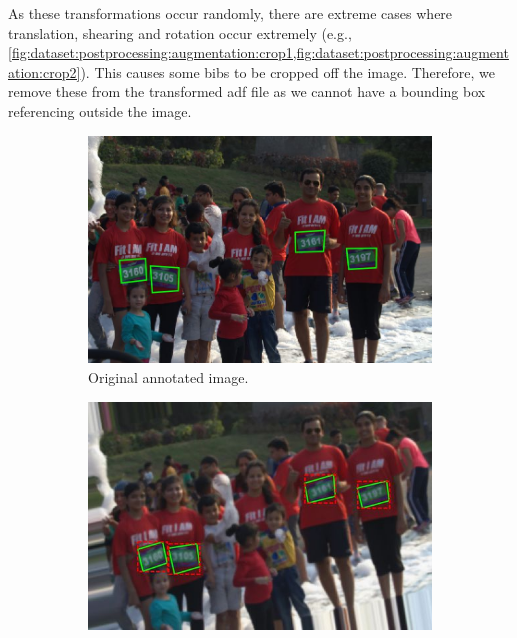 As these transformations occur randomly, there are extreme cases where translation, shearing and rotation occur extremely (e.g., \cref{fig:dataset:postprocessing:augmentation:crop1,fig:dataset:postprocessing:augmentation:crop2}). This causes some bibs to be cropped off the image. Therefore, we remove these from the transformed \gls{adf} file as we cannot have a bounding box referencing outside the image.

\begin{figure}[h!]
  \centering
  \hspace{\fill}
  \begin{subfigure}[b]{0.475\textwidth}
    \includegraphics[width=\textwidth]{images/dataset/augmentation/original}
    \caption{Original annotated image.}
  \end{subfigure}
  \hspace{\fill}
  \begin{subfigure}[b]{0.475\textwidth}
    \includegraphics[width=\textwidth]{images/dataset/augmentation/slight_rotate_blur}

\end{subfigure}
\end{figure}
